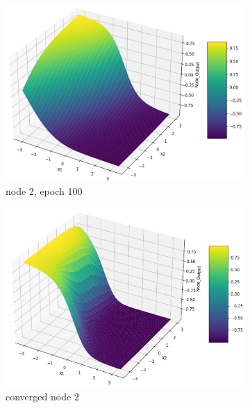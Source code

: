 \documentclass[11pt]{article}
\begin{document}
\begin{figure}[h!]
\begin{subfigure}[b]{0.45\textwidth}
	\includegraphics[scale=0.14]{hidden2_n2_e100.jpg}
	\caption{node 2, epoch 100}
	\label{fig:fig2.1.6.9}
	\end{subfigure}
	\begin{subfigure}[b]{0.45\textwidth}
	\centering
	\includegraphics[scale=0.14]{hidden2_n2_c.jpg}
	\caption{converged node 2}
	\label{fig:fig2.1.6.10}
	\end{subfigure}
	\begin{subfigure}[b]{0.3\textwidth}
	\centering

\end{subfigure}
\end{figure}
\end{document}
